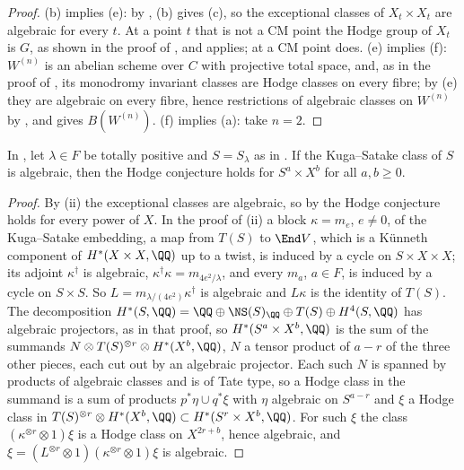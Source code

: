 \begin{proof}
(b) implies (e): by , (b) gives (c), so the
exceptional classes of $X_{t}\times X_{t}$ are algebraic for every $t$. At a
point $t$ that is not a CM point the Hodge group of $X_{t}$ is $G$, as shown
in the proof of , and 
applies; at a CM point  does. (e) implies (f):
$W^{(n)}$ is an abelian scheme over $C$ with projective total space, and, as
in the proof of , its monodromy invariant classes are
Hodge classes on every fibre; by (e) they are algebraic on every fibre, hence
restrictions of algebraic classes on $W^{(n)}$ by , and
 gives $B(W^{(n)})$. (f) implies (a): take $n=2$.
\end{proof}

\begin{corollary}\label{cor:mumfordksproducts}
In , let $\lambda\in F$ be totally positive and
$S=S_{\lambda}$ as in . If the Kuga--Satake class of $S$
is algebraic, then the Hodge conjecture holds for $S^{a}\times X^{b}$ for all
$a,b\ge0$.
\end{corollary}

\begin{proof}
By (ii) the exceptional classes are algebraic, so by
 the Hodge conjecture holds for every power of $X$.
In the proof of (ii) a block $\kappa=m_{e}$, $e\ne0$, of
the Kuga--Satake embedding, a map from $T(S)$ to $\End V$, which is a
K\"unneth component of $H^{*}(X\times X,\QQ)$ up to a twist, is induced by a
cycle on $S\times X\times X$; its adjoint $\kappa^{\dagger}$ is algebraic,
$\kappa^{\dagger}\kappa=m_{4e^{2}/\lambda}$, and every $m_{a}$, $a\in F$, is
induced by a cycle on $S\times S$. So
$L=m_{\lambda/(4e^{2})}\kappa^{\dagger}$ is algebraic and
$L\kappa$ is the identity of $T(S)$. The decomposition
$H^{*}(S,\QQ)=\QQ\oplus\NS(S)_{\QQ}\oplus T(S)\oplus H^{4}(S,\QQ)$ has
algebraic projectors, as in that proof, so $H^{*}(S^{a}\times X^{b},\QQ)$ is
the sum of the summands $N\otimes T(S)^{\otimes r}\otimes H^{*}(X^{b},\QQ)$,
$N$ a tensor product of $a-r$ of the three other pieces, each cut out by an
algebraic projector. Each such $N$ is spanned by products of algebraic classes
and is of Tate type, so a Hodge class in the summand is a sum of products
$p^{*}\eta\cup q^{*}\xi$ with $\eta$ algebraic on $S^{a-r}$ and $\xi$ a Hodge
class in $T(S)^{\otimes r}\otimes H^{*}(X^{b},\QQ)\subset H^{*}(S^{r}\times
X^{b},\QQ)$. For such $\xi$ the class $(\kappa^{\otimes r}\otimes1)\xi$ is a
Hodge class on $X^{2r+b}$, hence algebraic, and
$\xi=(L^{\otimes r}\otimes1)(\kappa^{\otimes r}\otimes1)\xi$ is algebraic.
\end{proof}

